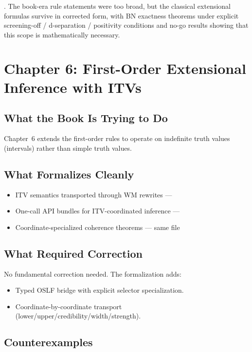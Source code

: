 \documentclass[11pt,openany]{report}
\begin{document}
\verdictCorrected{}.  The book-era rule statements were too broad, but
the classical extensional formulas survive in corrected form, with BN
exactness theorems under explicit screening-off / d-separation /
positivity conditions and no-go results showing that this scope is
mathematically necessary.


\chapter{Chapter 6: First-Order Extensional Inference with ITVs}
\label{ch:review-ch6}

\section{What the Book Is Trying to Do}

Chapter~6 extends the first-order rules to operate on indefinite truth
values (intervals) rather than simple truth values.

\section{What Formalizes Cleanly}

\begin{itemize}
\item ITV semantics transported through WM rewrites ---
\item One-call API bundles for ITV-coordinated inference ---
\item Coordinate-specialized coherence theorems ---
  same file
\end{itemize}

\section{What Required Correction}

No fundamental correction needed.  The formalization adds:
\begin{itemize}
\item Typed OSLF bridge with explicit selector specialization.
\item Coordinate-by-coordinate transport
  (lower/upper/credibility/width/strength).
\end{itemize}

\section{Counterexamples}
\end{document}
